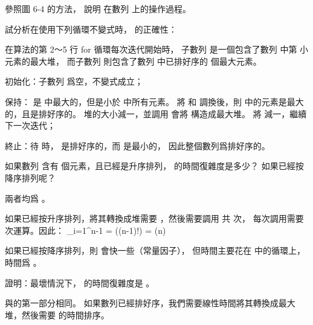 \startsection[
  title={The heapsort algorithm},
]

\startEXERCISE
參照圖 6-4 的方法，
說明  在數列  上的操作過程。
\stopEXERCISE

\startANSWER
\startcombination[4*3]
{\externalfigure[output/e6_4_1-1]}{}
{\externalfigure[output/e6_4_1-2]}{}
{\externalfigure[output/e6_4_1-3]}{}
{\externalfigure[output/e6_4_1-4]}{}
{\externalfigure[output/e6_4_1-5]}{}
{\externalfigure[output/e6_4_1-6]}{}
{\externalfigure[output/e6_4_1-7]}{}
{\externalfigure[output/e6_4_1-8]}{}
{\externalfigure[output/e6_4_1-9]}{}
\stopcombination
\stopANSWER

\startEXERCISE
試分析在使用下列循環不變式時，  的正確性：

在算法的第 2～5 行 {\EMP for} 循環每次迭代開始時，
子數列  是一個包含了數列  中第  小元素的最大堆，
而子數列  則包含了數列  中已排好序的  個最大元素。
\stopEXERCISE

\startANSWER
{\EMP 初始化：}子數列  爲空，不變式成立；

{\EMP 保持：}  是  中最大的，但是小於  中所有元素。
將  和  調換後，則  中的元素是最大的，且是排好序的。
堆的大小減一，並調用  會將  構造成最大堆。
將  減一，繼續下一次迭代；

{\EMP 終止：}待  時，  是排好序的，而  是最小的，
因此整個數列爲排好序的。
\stopANSWER

如果數列  含有  個元素，且已經是升序排列，  的時間復雜度是多少？
如果已經按降序排列呢？
\stopEXERCISE

\startANSWER
兩者均爲 。

如果已經按升序排列，將其轉換成堆需要 ，然後需要調用  共  次，
每次調用需要  次運算。因此：
\startformula
\sum_{i=1}^{n-1} = \lg((n-1)!) = \Theta(n)
\stopformula

如果已經按降序排列，則  會快一些（常量因子），
但時間主要花在  中的循環上，時間爲 。
\stopANSWER

\startEXERCISE
證明：最壞情況下，  的時間復雜度是 。
\stopEXERCISE

\startANSWER
與的第一部分相同。
如果數列已經排好序，我們需要線性時間將其轉換成最大堆，然後需要  的時間排序。
\stopANSWER

